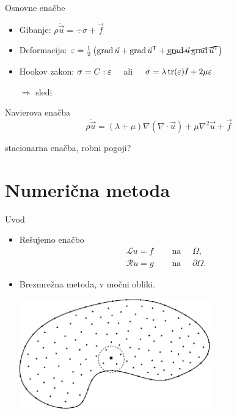 \begin{frame}{Osnovne enačbe}
  \begin{itemize}
    \item Gibanje: $\rho \ddot{\vec{u}} = \div \sigma + \vec{f}$ \\[3ex] \pause
    \item Deformacija: $\varepsilon = \frac12\left( \operatorname{grad} \vec{u} + \operatorname{grad}\vec{u}^{\mathsf{T}} + \cancel{\operatorname{grad} \vec{u}
      \operatorname{grad}\vec{u}^{\mathsf{T}}} \right)$ \\[3ex] \pause
    \item Hookov zakon: $\sigma = C : \varepsilon$ \ \ ali \ \ $\sigma = \lambda \operatorname{tr}(\varepsilon) I + 2\mu \varepsilon$
      \\[3ex]  \pause
    \item[$\Rightarrow$] sledi \mbox{ } \\[3ex]
  \end{itemize}

  \begin{block}{Navierova enačba}
    \vspace{-1ex}
    \[
      \rho \ddot{\vec{u}} =
      (\lambda + \mu) \nabla(\nabla\cdot \vec{u}) + \mu \nabla^2 \vec{u} + \vec{f}
    \]
  \end{block} \pause
  stacionarna enačba, robni pogoji? %
\end{frame}

\section{Numerična metoda}

\begin{frame}{Uvod}
  \begin{itemize}
    \item Rešujemo enačbo
      \begin{align*}
        \mathcal{L} u = f& \quad \text{ na } \quad \Omega, \\
        \mathcal{R} u = g& \quad \text{ na } \quad \partial\Omega.
      \end{align*}
    \item Brezmrežna metoda, v močni obliki. \vspace{1ex}
      \begin{center}
      \includegraphics[width=0.65\textwidth]{resources/domain_theoretical.pdf}
      \end{center}
  \end{itemize}
\end{frame}

